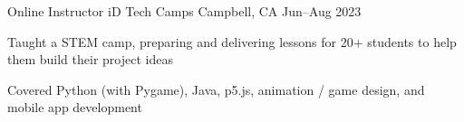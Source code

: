 \experience
{Online Instructor}
{iD Tech Camps}
{Campbell, CA}
{Jun--Aug 2023}
{
	\item Taught a STEM camp, preparing and delivering lessons for 20+ students to help them build their project ideas
	\item Covered Python (with Pygame), Java, p5.js, animation / game design, and mobile app development
}
